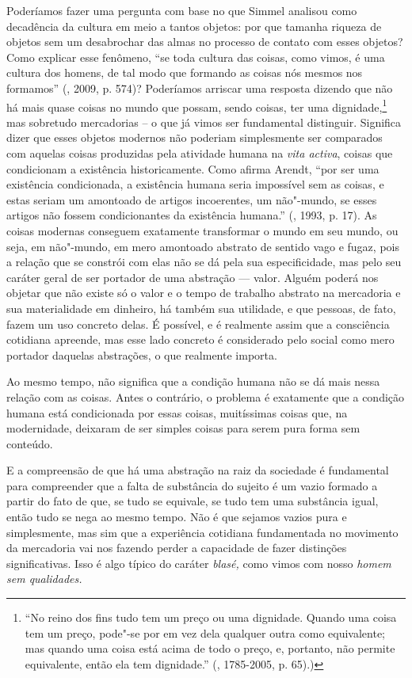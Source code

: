 Poderíamos fazer uma pergunta com base no que Simmel analisou como
decadência da cultura em meio a tantos objetos: por que tamanha riqueza
de objetos sem um desabrochar das almas no processo de contato com esses
objetos? Como explicar esse fenômeno, ``se toda cultura das coisas, como
vimos, é uma cultura dos homens, de tal modo que formando as coisas nós
mesmos nos formamos'' (, 2009, p. 574)? Poderíamos
arriscar uma resposta dizendo que não há mais quase coisas no mundo que
possam, sendo coisas, ter uma dignidade,\footnote{``No reino dos fins
  tudo tem um preço ou uma dignidade. Quando uma coisa tem um preço,
  pode"-se por em vez dela qualquer outra como equivalente; mas quando
  uma coisa está acima de todo o preço, e, portanto, não permite
  equivalente, então ela tem dignidade.'' (, 1785-2005, p. 65).)}
mas sobretudo mercadorias -- o que já vimos ser fundamental distinguir.
Significa dizer que esses objetos modernos não poderiam simplesmente ser
comparados com aquelas coisas produzidas pela atividade humana na
\emph{vita activa}, coisas que condicionam a existência historicamente.
Como afirma Arendt, ``por ser uma existência condicionada, a existência
humana seria impossível sem as coisas, e estas seriam um amontoado de
artigos incoerentes, um não"-mundo, se esses artigos não fossem
condicionantes da existência humana.'' (, 1993, p. 17). As coisas
modernas conseguem exatamente transformar o mundo em seu mundo, ou seja,
em não"-mundo, em mero amontoado abstrato de sentido vago e fugaz, pois a
relação que se constrói com elas não se dá pela sua especificidade, mas
pelo seu caráter geral de ser portador de uma abstração --- valor.
Alguém poderá nos objetar que não existe só o valor e o tempo de
trabalho abstrato na mercadoria e sua materialidade em dinheiro, há
também sua utilidade, e que pessoas, de fato, fazem um uso concreto
delas. É possível, e é realmente assim que a consciência cotidiana
apreende, mas esse lado concreto é considerado pelo social como mero
portador daquelas abstrações, o que realmente importa.

Ao mesmo tempo, não significa que a condição humana não se dá mais nessa
relação com as coisas. Antes o contrário, o problema é exatamente que a
condição humana está condicionada por essas coisas, muitíssimas coisas
que, na modernidade, deixaram de ser simples coisas para serem pura
forma sem conteúdo.

E a compreensão de que há uma abstração na raiz da sociedade é
fundamental para compreender que a falta de substância do sujeito é um
vazio formado a partir do fato de que, se tudo se equivale, se tudo tem
uma substância igual, então tudo se nega ao mesmo tempo. Não é que
sejamos vazios pura e simplesmente, mas sim que a experiência cotidiana
fundamentada no movimento da mercadoria vai nos fazendo perder a
capacidade de fazer distinções significativas. Isso é algo típico do
caráter \emph{blasé,} como vimos com nosso \emph{homem sem qualidades.}


